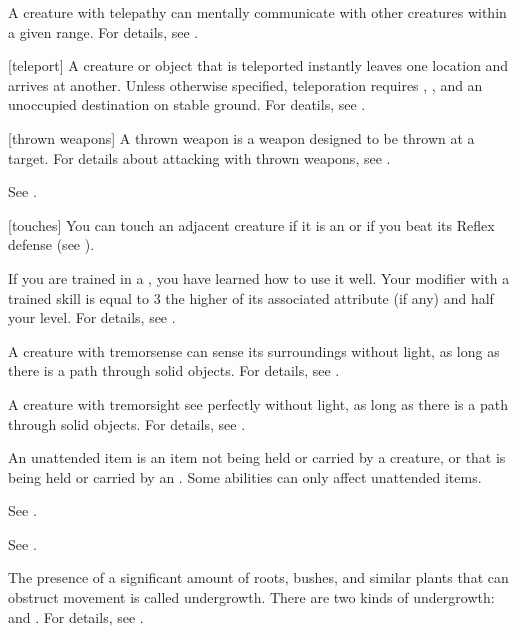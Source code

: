  A creature with telepathy can mentally communicate with other creatures within a given range.
For details, see .

[teleport] A creature or object that is teleported instantly leaves one location and arrives at another.
Unless otherwise specified, teleporation requires , , and an unoccupied destination on stable ground.
For deatils, see .

[thrown weapons] A thrown weapon is a weapon designed to be thrown at a target.
For details about attacking with thrown weapons, see .

 See .

[touches] You can touch an adjacent creature if it is an  or if you beat its Reflex defense (see ).


 If you are trained in a , you have learned how to use it well.
Your modifier with a trained skill is equal to 3 \add the higher of its associated attribute (if any) and half your level.
For details, see .

 A creature with tremorsense can sense its surroundings without light, as long as there is a path through solid objects.
For details, see .

 A creature with tremorsight see perfectly without light, as long as there is a path through solid objects.
For details, see .

 An unattended item is an item not being held or carried by a creature, or that is being held or carried by an .
Some abilities can only affect unattended items.

 See .

 See .

 The presence of a significant amount of roots, bushes, and similar plants that can obstruct movement is called undergrowth.
There are two kinds of undergrowth:  and .
For details, see .

